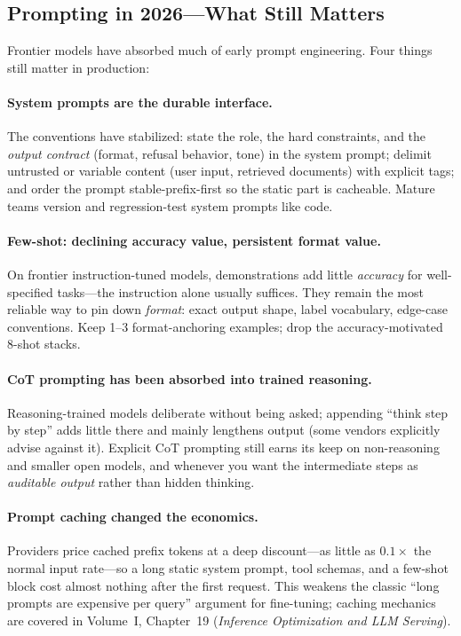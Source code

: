 \subsection{Prompting in 2026---What Still Matters}
\label{sec:prompting_2026}

Frontier models have absorbed much of early prompt engineering.  Four
things still matter in production:

\paragraph{System prompts are the durable interface.}
The conventions have stabilized: state the role, the hard constraints, and
the \emph{output contract} (format, refusal behavior, tone) in the system
prompt; delimit untrusted or variable content (user input, retrieved
documents) with explicit tags; and order the prompt stable-prefix-first so
the static part is cacheable.  Mature teams version and regression-test
system prompts like code.

\paragraph{Few-shot: declining accuracy value, persistent format value.}
On frontier instruction-tuned models, demonstrations add little
\emph{accuracy} for well-specified tasks---the instruction alone usually
suffices.  They remain the most reliable way to pin down \emph{format}:
exact output shape, label vocabulary, edge-case conventions.  Keep 1--3
format-anchoring examples; drop the accuracy-motivated 8-shot stacks.

\paragraph{CoT prompting has been absorbed into trained reasoning.}
Reasoning-trained models deliberate without being asked; appending ``think
step by step'' adds little there and mainly lengthens output (some vendors
explicitly advise against it).  Explicit CoT prompting still earns its keep
on non-reasoning and smaller open models, and whenever you want the
intermediate steps as \emph{auditable output} rather than hidden thinking.

\paragraph{Prompt caching changed the economics.}
Providers price cached prefix tokens at a deep discount---as little as
$0.1\times$ the normal input rate---so a long static system prompt, tool
schemas, and a few-shot block cost almost nothing after the first request.  This weakens the
classic ``long prompts are expensive per query'' argument for fine-tuning;
caching mechanics are covered in Volume~I, Chapter~19 (\emph{Inference
Optimization and LLM Serving}).


